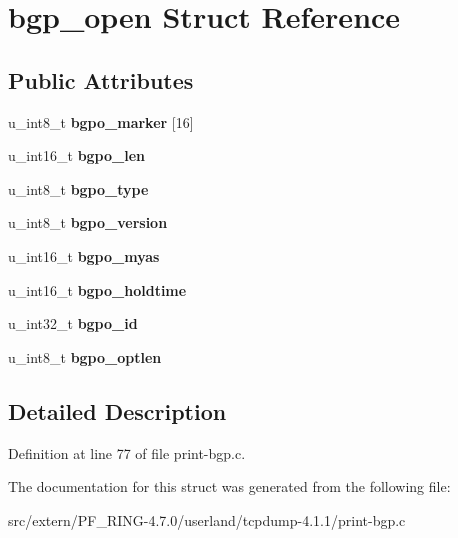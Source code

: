 \hypertarget{structbgp__open}{
\section{bgp\_\-open Struct Reference}
\label{structbgp__open}
}
\subsection*{Public Attributes}
\begin{DoxyCompactItemize}
\item 
\hypertarget{structbgp__open_ad298ddd4f354de7abd69b5a008a70a1b}{
u\_\-int8\_\-t {\bfseries bgpo\_\-marker} \mbox{[}16\mbox{]}}
\label{structbgp__open_ad298ddd4f354de7abd69b5a008a70a1b}

\item 
\hypertarget{structbgp__open_aff0ee217d501b55d9d5d897873b2daef}{
u\_\-int16\_\-t {\bfseries bgpo\_\-len}}
\label{structbgp__open_aff0ee217d501b55d9d5d897873b2daef}

\item 
\hypertarget{structbgp__open_a76e4b88cf8ea8270814fa39a6c75cbe9}{
u\_\-int8\_\-t {\bfseries bgpo\_\-type}}
\label{structbgp__open_a76e4b88cf8ea8270814fa39a6c75cbe9}

\item 
\hypertarget{structbgp__open_a9f47518319152c8495d6d993b9c1550f}{
u\_\-int8\_\-t {\bfseries bgpo\_\-version}}
\label{structbgp__open_a9f47518319152c8495d6d993b9c1550f}

\item 
\hypertarget{structbgp__open_aac3ec588b812c33e4121f306aff84ff8}{
u\_\-int16\_\-t {\bfseries bgpo\_\-myas}}
\label{structbgp__open_aac3ec588b812c33e4121f306aff84ff8}

\item 
\hypertarget{structbgp__open_ac9e8ef7504b13c8677ad695304fa4334}{
u\_\-int16\_\-t {\bfseries bgpo\_\-holdtime}}
\label{structbgp__open_ac9e8ef7504b13c8677ad695304fa4334}

\item 
\hypertarget{structbgp__open_af4f26b5093a1a8b35e9b87f17e987fb3}{
u\_\-int32\_\-t {\bfseries bgpo\_\-id}}
\label{structbgp__open_af4f26b5093a1a8b35e9b87f17e987fb3}

\item 
\hypertarget{structbgp__open_a26e1d6c4fbae7f93cc41ea8f8ad8b9d4}{
u\_\-int8\_\-t {\bfseries bgpo\_\-optlen}}
\label{structbgp__open_a26e1d6c4fbae7f93cc41ea8f8ad8b9d4}

\end{DoxyCompactItemize}


\subsection{Detailed Description}


Definition at line 77 of file print-\/bgp.c.



The documentation for this struct was generated from the following file:\begin{DoxyCompactItemize}
\item 
src/extern/PF\_\-RING-\/4.7.0/userland/tcpdump-\/4.1.1/print-\/bgp.c\end{DoxyCompactItemize}
